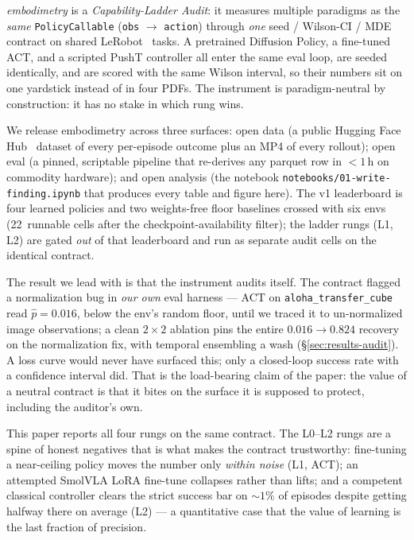 \documentclass[10pt]{article}
\begin{document}
\emph{embodimetry} is a \emph{Capability-Ladder Audit}: it measures
multiple paradigms as the \emph{same} \texttt{PolicyCallable}
(\texttt{obs} $\to$ \texttt{action}) through \emph{one} seed /
Wilson-CI / MDE contract on shared LeRobot~\cite{cadene2024lerobot}
tasks. A pretrained Diffusion Policy, a fine-tuned ACT, and a scripted
PushT controller all enter the same eval loop, are seeded identically,
and are scored with the same Wilson interval, so their numbers sit on
one yardstick instead of in four PDFs. The instrument is paradigm-neutral
by construction: it has no stake in which rung wins.

We release embodimetry across three surfaces: open data (a public
Hugging Face Hub~\cite{huggingfacehub2024} dataset of every per-episode
outcome plus an MP4 of every rollout); open eval (a pinned, scriptable
pipeline that re-derives any parquet row in $<1$\,h on commodity
hardware); and open analysis (the notebook
\texttt{notebooks/01-write-finding.ipynb} that produces every table and
figure here). The v1 leaderboard is four learned policies and two
weights-free floor baselines crossed with six envs (22~runnable cells
after the checkpoint-availability filter); the ladder rungs (L1, L2) are
gated \emph{out} of that leaderboard and run as separate audit cells on
the identical contract.

The result we lead with is that the instrument audits itself. The
contract flagged a normalization bug in \emph{our own} eval harness ---
ACT on \texttt{aloha\_transfer\_cube} read $\hat{p}{=}0.016$, below the
env's random floor, until we traced it to un-normalized image
observations; a clean $2{\times}2$ ablation pins the entire
$0.016\to0.824$ recovery on the normalization fix, with temporal
ensembling a wash (\S\ref{sec:results-audit}). A loss curve would never
have surfaced this; only a closed-loop success rate with a confidence
interval did. That is the load-bearing claim of the paper: the value of a
neutral contract is that it bites on the surface it is supposed to
protect, including the auditor's own.

This paper reports all four rungs on the same contract. The L0--L2 rungs
are a spine of honest negatives that is what makes the contract
trustworthy: fine-tuning a near-ceiling policy moves the number only
\emph{within noise} (L1, ACT); an attempted SmolVLA LoRA fine-tune
collapses rather than lifts; and a competent classical controller clears
the strict success bar on ${\sim}1\%$ of episodes despite getting halfway
there on average (L2) --- a quantitative case that the value of learning
is the last fraction of precision.
\end{document}
